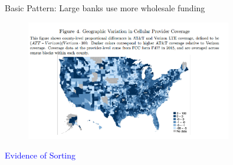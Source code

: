 \documentclass[notes,10pt, aspectratio=169]{beamer}
\begin{document}
    \begin{frame}{Basic Pattern: Large banks use more wholesale funding}

        
        \begin{figure}
            \centering
            \includegraphics[width=0.8\textwidth]{imgs/fig4.png}
            \label{fig:my_label}
        \end{figure}
        
        \end{frame}

\begin{frame}[noframenumbering]

    \huge \centering \textcolor{blue}{Evidence of Sorting}
\end{frame}
\end{document}
